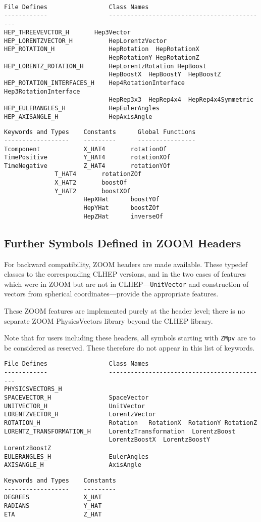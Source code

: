 \documentclass[twoside,12pt]{article}
\begin{document}
\begin{verbatim}
File Defines                 Class Names
------------                 --------------------------------------------
HEP_THREEVEVCTOR_H 	     Hep3Vector
HEP_LORENTZVECTOR_H          HepLorentzVector
HEP_ROTATION_H               HepRotation  HepRotationX  
                             HepRotationY HepRotationZ
HEP_LORENTZ_ROTATION_H       HepLorentzRotation HepBoost 
                             HepBoostX  HepBoostY  HepBoostZ
HEP_ROTATION_INTERFACES_H    Hep4RotationInterface  Hep3RotationInterface 
                             HepRep3x3  HepRep4x4  HepRep4x4Symmetric  
HEP_EULERANGLES_H            HepEulerAngles
HEP_AXISANGLE_H              HepAxisAngle
\end{verbatim}

\begin{verbatim}
Keywords and Types    Constants      Global Functions
------------------    ---------      ----------------	
Tcomponent            X_HAT4	   rotationOf
TimePositive          Y_HAT4       rotationXOf     
TimeNegative          Z_HAT4       rotationYOf         
		      T_HAT4       rotationZOf     
		      X_HAT2	   boostOf	
		      Y_HAT2	   boostXOf	
                      HepXHat      boostYOf
                      HepYHat      boostZOf
                      HepZHat      inverseOf
\end{verbatim}

\subsection {Further Symbols Defined in ZOOM Headers} 


For backward compatibility, ZOOM headers are made available.  
These typedef classes to the corresponding CLHEP versions, 
and in the two cases of features which were in ZOOM but are not in
CLHEP---{\tt UnitVector} and construction of vectors from 
spherical coordinates---provide the appropriate features.

These ZOOM features are implemented purely at the header level; there
is no separate ZOOM PhysicsVectors library beyond the CLHEP library.

Note that for users including these headers, all symbols starting with
{\tt ZMpv} are to be considered as reserved.  These therefore do not
appear in this list of keywords.

\begin{verbatim}
File Defines                 Class Names
------------                 --------------------------------------------
PHYSICSVECTORS_H 
SPACEVECTOR_H                SpaceVector 
UNITVECTOR_H                 UnitVector
LORENTZVECTOR_H              LorentzVector
ROTATION_H                   Rotation	RotationX  RotationY RotationZ
LORENTZ_TRANSFORMATION_H     LorentzTransformation  LorentzBoost 
                             LorentzBoostX  LorentzBoostY  LorentzBoostZ
EULERANGLES_H                EulerAngles
AXISANGLE_H                  AxisAngle
\end{verbatim}

\begin{verbatim}
Keywords and Types    Constants    
------------------    ---------    
DEGREES               X_HAT        
RADIANS               Y_HAT        
ETA                   Z_HAT        
\end{verbatim}
\end{document}
